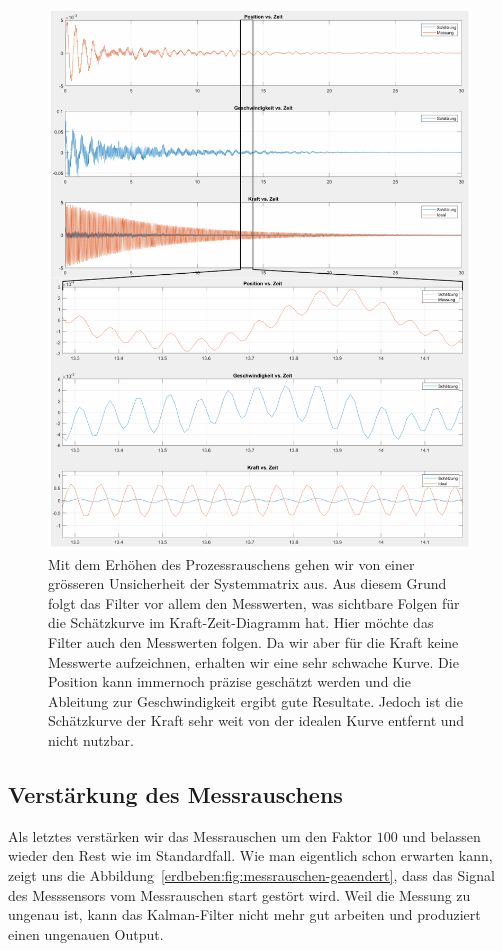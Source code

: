 \begin{figure}
  \begin{center}
    \includegraphics[width=.95\linewidth,keepaspectratio]{papers/erdbeben/images/Prozessrauschen_geaendert.PDF}
    \caption{
      Mit dem Erhöhen des Prozessrauschens gehen wir von einer grösseren Unsicherheit der Systemmatrix aus.
      Aus diesem Grund folgt das Filter vor allem den Messwerten,
      was sichtbare Folgen für die Schätzkurve im Kraft-Zeit-Diagramm hat.
      Hier möchte das Filter auch den Messwerten folgen.
      Da wir aber für die Kraft keine Messwerte aufzeichnen,
      erhalten wir eine sehr schwache Kurve.
      Die Position kann immernoch präzise geschätzt werden und die Ableitung zur Geschwindigkeit ergibt gute Resultate.
      Jedoch ist die Schätzkurve der Kraft sehr weit von der idealen Kurve entfernt und nicht nutzbar.
    }
    \label{erdbeben:fig:prozessrauschen-geaendert}
  \end{center}
\end{figure}

\subsection{Verstärkung des Messrauschens}
Als letztes verstärken wir das Messrauschen um den Faktor $100$ und belassen wieder den Rest wie im Standardfall.
Wie man eigentlich schon erwarten kann,
zeigt uns die Abbildung~\ref{erdbeben:fig:messrauschen-geaendert},
dass das Signal des Messsensors vom Messrauschen start gestört wird.
Weil die Messung zu ungenau ist,
kann das Kalman-Filter nicht mehr gut arbeiten und produziert einen ungenauen Output.

